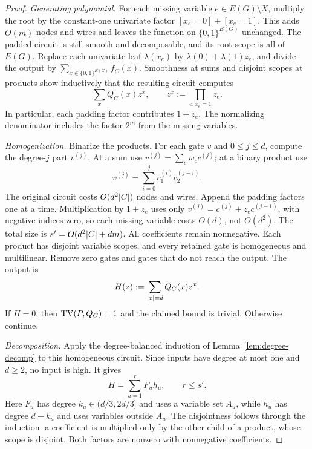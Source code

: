 \begin{proof}
\emph{Generating polynomial.} For each missing variable $e\in E(G)\setminus X$, multiply the root by the constant-one univariate factor $[x_e=0]+[x_e=1]$. This adds $O(m)$ nodes and wires and leaves the function on $\{0,1\}^{E(G)}$ unchanged. The padded circuit is still smooth and decomposable, and its root scope is all of $E(G)$. Replace each univariate leaf $\lambda(x_e)$ by $\lambda(0)+\lambda(1)z_e$, and divide the output by $\sum_{x\in\{0,1\}^{E(G)}}f_C(x)$. Smoothness at sums and disjoint scopes at products show inductively that the resulting circuit computes
\[
  \sum_xQ_C(x)z^x,\qquad z^x:=\prod_{e:x_e=1}z_e.
\]
In particular, each padding factor contributes $1+z_e$. The normalizing denominator includes the factor $2^m$ from the missing variables.

\emph{Homogenization.} Binarize the products. For each gate $v$ and $0\le j\le d$, compute the degree-$j$ part $v^{(j)}$. At a sum use $v^{(j)}=\sum_cw_cc^{(j)}$; at a binary product use
\[
  v^{(j)}=\sum_{i=0}^jc_1^{(i)}c_2^{(j-i)}.
\]
The original circuit costs $O(d^2\lvert C\rvert)$ nodes and wires. Append the padding factors one at a time. Multiplication by $1+z_e$ uses only $v^{(j)}=c^{(j)}+z_ec^{(j-1)}$, with negative indices zero, so each missing variable costs $O(d)$, not $O(d^2)$. The total size is $s'=O(d^2\lvert C\rvert+dm)$. All coefficients remain nonnegative. Each product has disjoint variable scopes, and every retained gate is homogeneous and multilinear. Remove zero gates and gates that do not reach the output. The output is
\[
  H(z):=\sum_{\lvert x\rvert=d}Q_C(x)z^x.
\]
If $H=0$, then $\mathrm{TV}(P,Q_C)=1$ and the claimed bound is trivial. Otherwise continue.

\emph{Decomposition.} Apply the degree-balanced induction of Lemma~\ref{lem:degree-decomp} to this homogeneous circuit. Since inputs have degree at most one and $d\ge2$, no input is high. It gives
\[
  H=\sum_{u=1}^rF_uh_u,\qquad r\le s'.
\]
Here $F_u$ has degree $k_u\in(d/3,2d/3]$ and uses a variable set $A_u$, while $h_u$ has degree $d-k_u$ and uses variables outside $A_u$. The disjointness follows through the induction: a coefficient is multiplied only by the other child of a product, whose scope is disjoint. Both factors are nonzero with nonnegative coefficients.


\end{proof}
